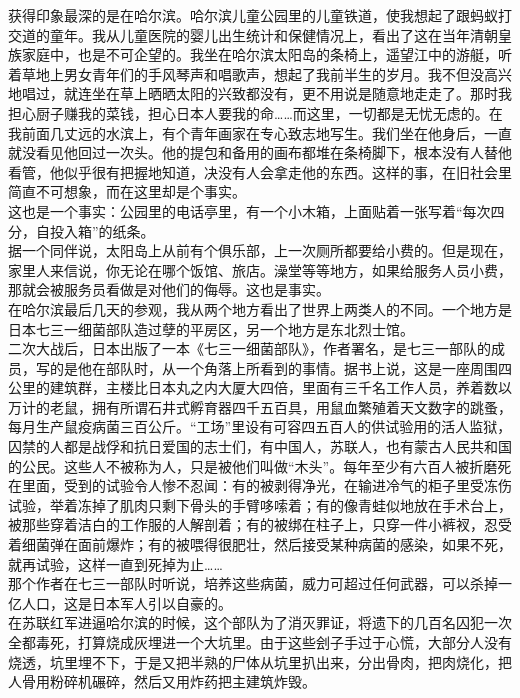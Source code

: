 获得印象最深的是在哈尔滨。哈尔滨儿童公园里的儿童铁道，使我想起了跟蚂蚁打交道的童年。我从儿童医院的婴儿出生统计和保健情况上，看出了这在当年清朝皇族家庭中，也是不可企望的。我坐在哈尔滨太阳岛的条椅上，遥望江中的游艇，听着草地上男女青年们的手风琴声和唱歌声，想起了我前半生的岁月。我不但没高兴地唱过，就连坐在草上晒晒太阳的兴致都没有，更不用说是随意地走走了。那时我担心厨子赚我的菜钱，担心日本人要我的命……而这里，一切都是无忧无虑的。在我前面几丈远的水滨上，有个青年画家在专心致志地写生。我们坐在他身后，一直就没看见他回过一次头。他的提包和备用的画布都堆在条椅脚下，根本没有人替他看管，他似乎很有把握地知道，决没有人会拿走他的东西。这样的事，在旧社会里简直不可想象，而在这里却是个事实。\\

这也是一个事实：公园里的电话亭里，有一个小木箱，上面贴着一张写着“每次四分，自投入箱”的纸条。\\

据一个同伴说，太阳岛上从前有个俱乐部，上一次厕所都要给小费的。但是现在，家里人来信说，你无论在哪个饭馆、旅店。澡堂等等地方，如果给服务人员小费，那就会被服务员看做是对他们的侮辱。这也是事实。\\

在哈尔滨最后几天的参观，我从两个地方看出了世界上两类人的不同。一个地方是日本七三一细菌部队造过孽的平房区，另一个地方是东北烈士馆。\\

二次大战后，日本出版了一本《七三一细菌部队》，作者署名，是七三一部队的成员，写的是他在部队时，从一个角落上所看到的事情。据书上说，这是一座周围四公里的建筑群，主楼比日本丸之内大厦大四倍，里面有三千名工作人员，养着数以万计的老鼠，拥有所谓石井式孵育器四千五百具，用鼠血繁殖着天文数字的跳蚤，每月生产鼠疫病菌三百公斤。“工场”里设有可容四五百人的供试验用的活人监狱，囚禁的人都是战俘和抗日爱国的志士们，有中国人，苏联人，也有蒙古人民共和国的公民。这些人不被称为人，只是被他们叫做“木头”。每年至少有六百人被折磨死在里面，受到的试验令人惨不忍闻：有的被剥得净光，在输进冷气的柜子里受冻伤试验，举着冻掉了肌肉只剩下骨头的手臂哆嗦着；有的像青蛙似地放在手术台上，被那些穿着洁白的工作服的人解剖着；有的被绑在柱子上，只穿一件小裤衩，忍受着细菌弹在面前爆炸；有的被喂得很肥壮，然后接受某种病菌的感染，如果不死，就再试验，这样一直到死掉为止……\\

那个作者在七三一部队时听说，培养这些病菌，威力可超过任何武器，可以杀掉一亿人口，这是日本军人引以自豪的。\\

在苏联红军进逼哈尔滨的时候，这个部队为了消灭罪证，将遗下的几百名囚犯一次全都毒死，打算烧成灰埋进一个大坑里。由于这些刽子手过于心慌，大部分人没有烧透，坑里埋不下，于是又把半熟的尸体从坑里扒出来，分出骨肉，把肉烧化，把人骨用粉碎机碾碎，然后又用炸药把主建筑炸毁。\\

